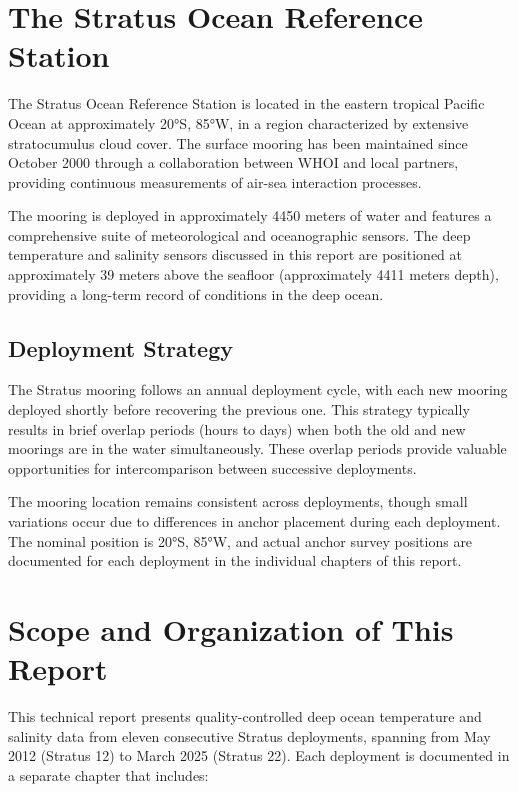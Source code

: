 \section{The Stratus Ocean Reference Station}

The Stratus Ocean Reference Station is located in the eastern tropical Pacific Ocean at approximately 20°S, 85°W, in a region characterized by extensive stratocumulus cloud cover. The surface mooring has been maintained since October 2000 through a collaboration between WHOI and local partners, providing continuous measurements of air-sea interaction processes.

The mooring is deployed in approximately 4450 meters of water and features a comprehensive suite of meteorological and oceanographic sensors. The deep temperature and salinity sensors discussed in this report are positioned at approximately 39 meters above the seafloor (approximately 4411 meters depth), providing a long-term record of conditions in the deep ocean.

\subsection{Deployment Strategy}

The Stratus mooring follows an annual deployment cycle, with each new mooring deployed shortly before recovering the previous one. This strategy typically results in brief overlap periods (hours to days) when both the old and new moorings are in the water simultaneously. These overlap periods provide valuable opportunities for intercomparison between successive deployments.

The mooring location remains consistent across deployments, though small variations occur due to differences in anchor placement during each deployment. The nominal position is 20°S, 85°W, and actual anchor survey positions are documented for each deployment in the individual chapters of this report.

\section{Scope and Organization of This Report}

This technical report presents quality-controlled deep ocean temperature and salinity data from eleven consecutive Stratus deployments, spanning from May 2012 (Stratus 12) to March 2025 (Stratus 22). Each deployment is documented in a separate chapter that includes:

